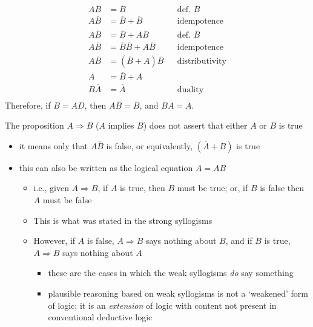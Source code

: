 \documentclass[9pt, letterpaper]{article}
\begin{document}
\begin{itemize}
\begin{item}
\begin{itemize}
\begin{item}
\begin{align*}
                    A \overline{B} &= \overline{B} && \text{def. $\overline{B}$} \\
                    A \overline{B} &= \overline{B} + \overline{B} && \text{idempotence} \\
                    A \overline{B} &= \overline{B} + A\overline{B} && \text{def. $\overline{B}$} \\
                    A \overline{B} &= \bar{B}\bar{B} + A\overline{B} && \text{idempotence} \\
                    A \overline{B} &= \left(\overline{B} + A\right)\overline{B} && \text{distributivity} \\
                    A &= \overline{B} + A \\
                    B\overline{A} &= \overline{A} && \text{duality} \\
                \end{align*}
                Therefore, if $\overline{B}=AD$, then $A\overline{B}=\overline{B}$, and $B\overline{A}=\overline{A}$.
            \end{item}
        \end{itemize}
    \end{item}
    \begin{item}
        The proposition $A \Rightarrow B$ ($A$ implies $B$) does not assert that either $A$ or $B$ is true
        \begin{itemize}
            \item{it means only that $A \overline{B}$ is false, or equivalently, $\left(\overline{A} + B \right)$ is true}
            \item{this can also be written as the logical equation $A=AB$}
                \begin{itemize}
                    \item{i.e., given $A \Rightarrow B$, if $A$ is true, then $B$ must be true; or, if $B$ is false then $A$ must be false}
                    \item{This is what was stated in the strong syllogisms}
                    \item{However, if $A$ is false, $A \Rightarrow B$ says nothing about $B$, and if $B$ is true, $A \Rightarrow B$ says nothing about $A$}
                        \begin{itemize}
                            \item{these are the cases in which the weak syllogisms \textit{do} say something}
                            \item{plausible reasoning based on weak syllogisms is not a `weakened' form of logic; it is an \textit{extension} of logic with content not present in conventional deductive logic}

\end{itemize}
\end{itemize}
\end{itemize}
\end{item}
\end{itemize}
\end{document}
